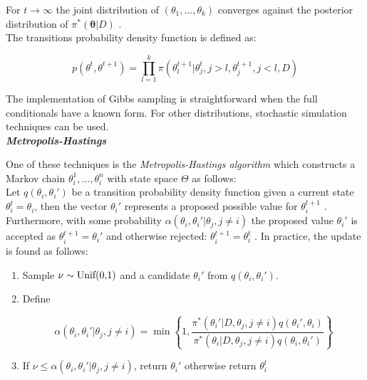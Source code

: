 For $t\rightarrow{}\infty$ the joint distribution of $(\theta_1,...,\theta_k)$ converges against the posterior distribution of $\pi^*(\bm{\theta}|D)$ \citep{Roberts1994, Geman1984}. \\
The transitions probability density function is defined as:

\begin{equation}
p(\theta^t,\theta^{t+1})=\prod_{l=1}^k{}\pi(\theta_l^{t+1}|\theta_j^t,j>l,\theta_j^{t+1},j<l,D)
\end{equation}

The implementation of Gibbs sampling is straightforward when the full conditionals have a known form. For other distributions, stochastic simulation techniques can be used.\\

\textbf{\textit{Metropolis-Hastings}}

One of these techniques is the \emph{Metropolis-Hastings algorithm} \citep{Metropolis1953, hastings1970} which constructs a Markov chain $\theta_i^1,...,\theta_i^n$ with state space $\Theta$ as follows:\\
Let $q(\theta_i,\theta_i')$ be a transition probability density function given a current state $\theta_i^t=\theta_i$, then the vector $\theta_i'$ represents a proposed possible value for $\theta_i^{t+1}$ \citep{Bernardo2000}. Furthermore, with some probability $\alpha(\theta_i,\theta_i'|\theta_j,j\neq{}i)$ the proposed value $\theta_i'$ is accepted as $\theta_i^{t+1}=\theta_i'$ and otherwise rejected: $\theta_i^{t+1}=\theta_i^t$ \cite{Roberts1994, Hastings1970}. In practice, the update is found as follows:

\begin{enumerate}
\item Sample $\nu\sim\textnormal{Unif(0,1)}$ and a candidate $\theta_i'$ from $q(\theta_i,\theta_i')$.
\item Define

\begin{equation}
\alpha(\theta_i,\theta_i'|\theta_j,j\neq{}i)=\min\left\lbrace{}1,\frac{\pi^*(\theta_i'|D,\theta_j,j\neq{}i)q(\theta_i',\theta_i)}{\pi^*(\theta_i|D,\theta_j,j\neq{}i)q(\theta_i,\theta_i')}\right\rbrace
\end{equation}

\item If $\nu\leq{}\alpha(\theta_i,\theta_i'|\theta_j,j\neq{}i)$, return $\theta_i'$ otherwise return $\theta_i^t$
\end{enumerate}

